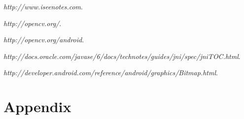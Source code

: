 \documentclass[pdftex,11pt,a4paper]{article}
\begin{document}


\renewcommand{\abstractname}{Executive Summary}

\tableofcontents
\listoffigures
\listoftables







\begin{thebibliography}{9}

  \emph{http://www.iseenotes.com}.

  \emph{http://opencv.org/}.

  \emph{http://opencv.org/android}.

  \emph{http://docs.oracle.com/javase/6/docs/technotes/guides/jni/spec/jniTOC.html}.

  \emph{http://developer.android.com/reference/android/graphics/Bitmap.html}.

\end{thebibliography}

\section{Appendix}
\end{document}
